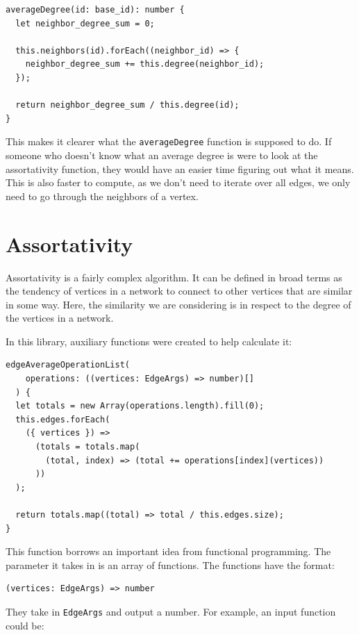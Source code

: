 \begin{verbatim}
averageDegree(id: base_id): number {
  let neighbor_degree_sum = 0;

  this.neighbors(id).forEach((neighbor_id) => {
    neighbor_degree_sum += this.degree(neighbor_id);
  });

  return neighbor_degree_sum / this.degree(id);
}
\end{verbatim}

This makes it clearer what the \texttt{averageDegree} function is supposed to do.
If someone who doesn't know what an average degree is were to look at the assortativity function,
they would have an easier time figuring out what it means.
This is also faster to compute, as we don't need to iterate over all edges,
we only need to go through the neighbors of a vertex.

\section{Assortativity}

Assortativity is a fairly complex algorithm.
It can be defined in broad terms as the tendency of
vertices in a network to connect to other vertices that
are similar in some way.
Here, the similarity we are considering is in respect to
the degree of the vertices in a network.

In this library, auxiliary functions were created to help calculate it:

\begin{verbatim}
edgeAverageOperationList(
    operations: ((vertices: EdgeArgs) => number)[]
  ) {
  let totals = new Array(operations.length).fill(0);
  this.edges.forEach(
    ({ vertices }) =>
      (totals = totals.map(
        (total, index) => (total += operations[index](vertices))
      ))
  );

  return totals.map((total) => total / this.edges.size);
}
\end{verbatim}

This function borrows an important idea from functional programming.
The parameter it takes in is an array of functions.
The functions have the format:

\begin{verbatim}
(vertices: EdgeArgs) => number
\end{verbatim}

They take in \texttt{EdgeArgs} and output a number.
For example, an input function could be:

